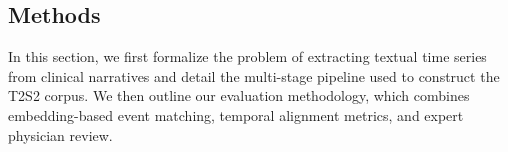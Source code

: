 \subsection{Methods}
In this section, we first formalize the problem of extracting textual time series from clinical narratives and detail the multi-stage pipeline used to construct the T2S2 corpus.
We then outline our evaluation methodology, which combines embedding-based event matching, temporal alignment metrics, and expert physician review.



